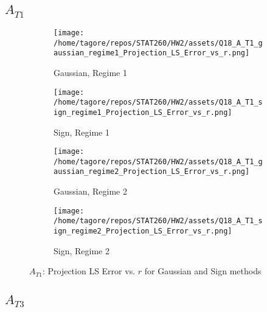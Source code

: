 \documentclass{article}
\begin{document}
\newpage

\subsection*{\(A_{T1}\)}

\begin{figure}[H]
    \centering
    \begin{subfigure}[b]{0.48\textwidth}
        \centering
        \texttt{[image: /home/tagore/repos/STAT260/HW2/assets/Q18\_A\_T1\_gaussian\_regime1\_Projection\_LS\_Error\_vs\_r.png]}
        \caption{Gaussian, Regime 1}
        \label{fig:T1_gaussian_regime1}
    \end{subfigure}
    \hfill
    \begin{subfigure}[b]{0.48\textwidth}
        \centering
        \texttt{[image: /home/tagore/repos/STAT260/HW2/assets/Q18\_A\_T1\_sign\_regime1\_Projection\_LS\_Error\_vs\_r.png]}
        \caption{Sign, Regime 1}
        \label{fig:T1_sign_regime1}
    \end{subfigure}
    
    \vspace{0.5cm}
    
    \begin{subfigure}[b]{0.48\textwidth}
        \centering
        \texttt{[image: /home/tagore/repos/STAT260/HW2/assets/Q18\_A\_T1\_gaussian\_regime2\_Projection\_LS\_Error\_vs\_r.png]}
        \caption{Gaussian, Regime 2}
        \label{fig:T1_gaussian_regime2}
    \end{subfigure}
    \hfill
    \begin{subfigure}[b]{0.48\textwidth}
        \centering
        \texttt{[image: /home/tagore/repos/STAT260/HW2/assets/Q18\_A\_T1\_sign\_regime2\_Projection\_LS\_Error\_vs\_r.png]}
        \caption{Sign, Regime 2}
        \label{fig:T1_sign_regime2}
    \end{subfigure}
    
    \caption{\(A_{T1}\): Projection LS Error vs. \(r\) for Gaussian and Sign methods}
    \label{fig:T1_projection_comparison}
\end{figure}

\newpage

\subsection*{\(A_{T3}\)}
\end{document}
